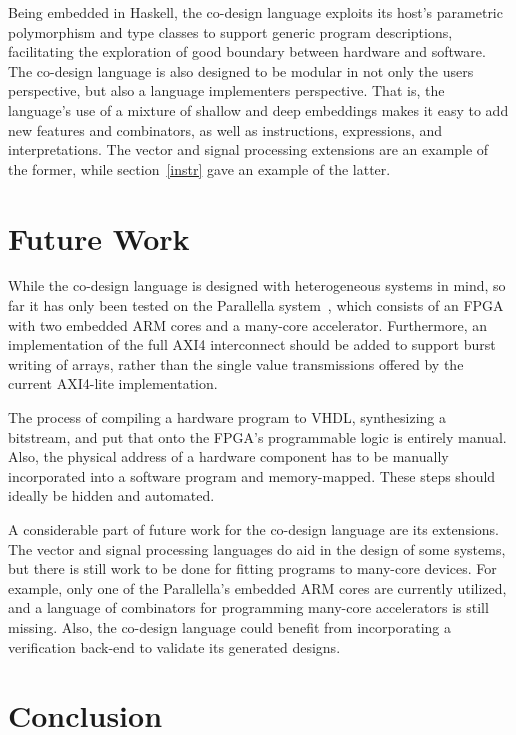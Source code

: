 \documentclass[../paper.tex]{subfiles}
\begin{document}
Being embedded in Haskell, the co-design language exploits its host's parametric polymorphism and type classes to support generic program descriptions, facilitating the exploration of good boundary between hardware and software. The co-design language is also designed to be modular in not only the users perspective, but also a language implementers perspective. That is, the language's use of a mixture of shallow and deep embeddings makes it easy to add new features and combinators, as well as instructions, expressions, and interpretations. The vector and signal processing extensions are an example of the former, while section~\ref{instr} gave an example of the latter.

\section{Future Work}
\label{future}

While the co-design language is designed with heterogeneous systems in mind, so far it has only been tested on the Parallella system~\cite{olofsson2014}, which consists of an FPGA with two embedded ARM cores and a many-core accelerator. Furthermore, an implementation of the full AXI4 interconnect should be added to support burst writing of arrays, rather than the single value transmissions offered by the current AXI4-lite implementation.

The process of compiling a hardware program to VHDL, synthesizing a bitstream, and put that onto the FPGA's programmable logic is entirely manual. Also, the physical address of a hardware component has to be manually incorporated into a software program and memory-mapped. These steps should ideally be hidden and automated.

A considerable part of future work for the co-design language are its extensions. The vector and signal processing languages do aid in the design of some systems, but there is still work to be done for fitting programs to many-core devices. For example, only one of the Parallella's embedded ARM cores are currently utilized, and a language of combinators for programming many-core accelerators is still missing. Also, the co-design language could benefit from incorporating a verification back-end to validate its generated designs.

\section{Conclusion}
\label{conc}
\end{document}
